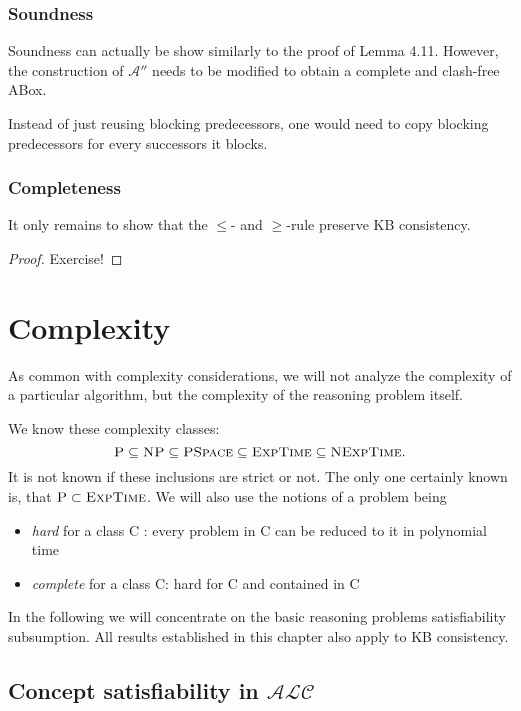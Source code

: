 \subsection{Soundness}
Soundness can actually be show similarly to the proof of Lemma 4.11.
However, the construction of $\mathcal{A}''$ needs to be modified
to obtain a complete and clash-free ABox.

Instead of just reusing blocking predecessors,
one would need to copy blocking predecessors for every successors it blocks.

\subsection{Completeness}
It only remains to show that the $ \leq$- and $ \geq$-rule preserve KB consistency.
\begin{proof}
	Exercise!
\end{proof}

\chapter{Complexity}
As common with complexity considerations,
we will not analyze the complexity of a particular algorithm,
but the complexity of the reasoning problem itself.

We know these complexity classes:
\[
	\textsc{P} \subseteq \textsc{NP} \subseteq \textsc{PSpace} \subseteq \textsc{ExpTime} \subseteq \textsc{NExpTime}
.\]
It is not known if these inclusions are strict or not.
The only one certainly known is, that $\textsc{P} \subset \textsc{ExpTime}$.
We will also use the notions of a problem being
\begin{itemize}
	\item \textit{hard} for a class \textsc{C} : every problem in \textsc{C} can be reduced to it in polynomial time
	\item \textit{complete} for a class \textsc{C}: hard for \textsc{C} and contained in \textsc{C} 
\end{itemize}

In the following we will concentrate on the basic reasoning problems satisfiability subsumption.
All results established in this chapter also apply to KB consistency.

\newpage
\section{Concept satisfiability in $\mathcal{ALC}$}

